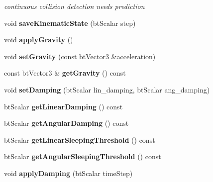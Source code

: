 \begin{DoxyCompactItemize}
\begin{DoxyCompactList}\small\item\em continuous collision detection needs prediction \end{DoxyCompactList}\item 
\mbox{\label{classbtRigidBody_a77b69b89ec3dfcd502e122cfaafdf4f6}} 
void {\bfseries save\+Kinematic\+State} (bt\+Scalar step)
\item 
\mbox{\label{classbtRigidBody_a08f1a05a572e7ff53f3874bda43c75b9}} 
void {\bfseries apply\+Gravity} ()
\item 
\mbox{\label{classbtRigidBody_a5aedec73517fb7b9cddcbd72663e0ddc}} 
void {\bfseries set\+Gravity} (const bt\+Vector3 \&acceleration)
\item 
\mbox{\label{classbtRigidBody_a081e31d62e12cca594466d1ae26082ac}} 
const bt\+Vector3 \& {\bfseries get\+Gravity} () const
\item 
\mbox{\label{classbtRigidBody_ace302f6d75db7e4cd64305dd4d20114b}} 
void {\bfseries set\+Damping} (bt\+Scalar lin\+\_\+damping, bt\+Scalar ang\+\_\+damping)
\item 
\mbox{\label{classbtRigidBody_abb2055b024d5f9262201a96482072c13}} 
bt\+Scalar {\bfseries get\+Linear\+Damping} () const
\item 
\mbox{\label{classbtRigidBody_a4dc018caac250454251d3fb58f020892}} 
bt\+Scalar {\bfseries get\+Angular\+Damping} () const
\item 
\mbox{\label{classbtRigidBody_a396bae2e385e6c4a8f31b2bedb513ac6}} 
bt\+Scalar {\bfseries get\+Linear\+Sleeping\+Threshold} () const
\item 
\mbox{\label{classbtRigidBody_a9c9e0b4a0c367af11e6ca82f4de4b539}} 
bt\+Scalar {\bfseries get\+Angular\+Sleeping\+Threshold} () const
\item 
\mbox{\label{classbtRigidBody_a3fecb8c50d734095f33e2c7624bfba2c}} 
void {\bfseries apply\+Damping} (bt\+Scalar time\+Step)

\end{DoxyCompactItemize}
